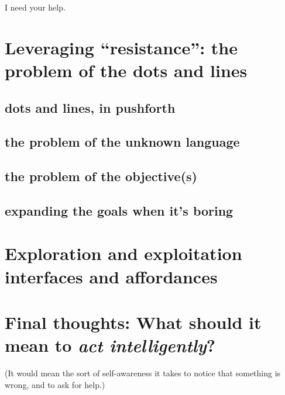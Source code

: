 I need your help.

\section{Leveraging ``resistance'': the problem of the dots and lines}\hypertarget{leveraging-resistance-the-problem-of-the-dots-and-lines}{}\label{leveraging-resistance-the-problem-of-the-dots-and-lines}

\subsection{dots and lines, in pushforth}\hypertarget{dots-and-lines-in-pushforth}{}\label{dots-and-lines-in-pushforth}

\subsection{the problem of the unknown language}\hypertarget{the-problem-of-the-unknown-language}{}\label{the-problem-of-the-unknown-language}

\subsection{the problem of the objective(s)}\hypertarget{the-problem-of-the-objectives}{}\label{the-problem-of-the-objectives}

\subsection{expanding the goals when it's boring}\hypertarget{expanding-the-goals-when-its-boring}{}\label{expanding-the-goals-when-its-boring}

\section{Exploration and exploitation interfaces and affordances}\hypertarget{exploration-and-exploitation-interfaces-and-affordances}{}\label{exploration-and-exploitation-interfaces-and-affordances}

\section{Final thoughts: What should it mean to \emph{act intelligently}?}\hypertarget{final-thoughts-what-should-it-mean-to-act-intelligently}{}\label{final-thoughts-what-should-it-mean-to-act-intelligently}

(It would mean the sort of self-awareness it takes to notice that something is wrong, and to ask for help.)

